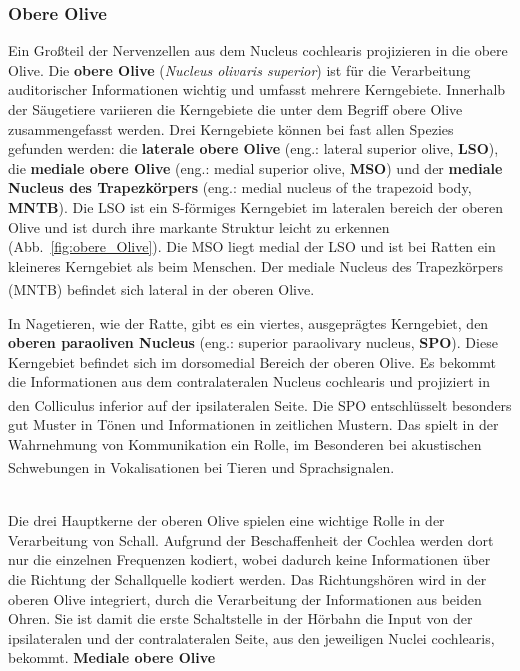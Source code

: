 \documentclass[12pt,a4paper,pdftex]{article}
\begin{document}
\subsubsection*{Obere Olive}
Ein Großteil der Nervenzellen aus dem Nucleus cochlearis projizieren in die obere Olive. Die \textbf{obere Olive} (\textit{Nucleus olivaris superior}) ist für die Verarbeitung auditorischer Informationen wichtig und umfasst mehrere Kerngebiete. Innerhalb der Säugetiere variieren die Kerngebiete die unter dem Begriff obere Olive zusammengefasst werden. Drei Kerngebiete können bei fast allen Spezies gefunden werden: die \textbf{laterale obere Olive} (eng.: lateral superior olive, \textbf{LSO}), die \textbf{mediale obere Olive} (eng.: medial superior olive, \textbf{MSO}) und der \textbf{mediale Nucleus des Trapezkörpers} (eng.: medial nucleus of the trapezoid body, \textbf{MNTB}). Die LSO ist ein S-förmiges Kerngebiet im lateralen bereich der oberen Olive und ist durch ihre markante Struktur leicht zu erkennen (Abb.~\ref{fig:obere_Olive}). Die MSO liegt medial der LSO und ist bei Ratten ein kleineres Kerngebiet als beim Menschen. Der mediale Nucleus des Trapezkörpers (MNTB) befindet sich lateral in der oberen Olive\textsuperscript{\cite[29]{paxinos2014rat}}.

In Nagetieren, wie der Ratte, gibt es ein viertes, ausgeprägtes Kerngebiet, den \textbf{oberen paraoliven Nucleus} (eng.: superior paraolivary nucleus, \textbf{SPO}). Diese Kerngebiet befindet sich im dorsomedial Bereich der oberen Olive. Es bekommt die Informationen aus dem contralateralen Nucleus cochlearis und projiziert in den Colliculus inferior auf der ipsilateralen Seite\textsuperscript{\cite[29]{paxinos2014rat}}. Die SPO entschlüsselt besonders gut Muster in Tönen und Informationen in zeitlichen Mustern. Das spielt in der Wahrnehmung von Kommunikation ein Rolle, im Besonderen bei akustischen Schwebungen in Vokalisationen bei Tieren und Sprachsignalen\textsuperscript{\cite[29]{paxinos2014rat}}. 
\\\\

\noindent Die drei Hauptkerne der oberen Olive spielen eine wichtige Rolle in der Verarbeitung von Schall. Aufgrund der Beschaffenheit der Cochlea werden dort nur die einzelnen Frequenzen kodiert, wobei dadurch keine Informationen über die Richtung der Schallquelle kodiert werden. Das Richtungshören wird in der oberen Olive integriert, durch die Verarbeitung der Informationen aus beiden Ohren. Sie ist damit die erste Schaltstelle in der Hörbahn die Input von der ipsilateralen und der contralateralen Seite, aus den jeweiligen Nuclei cochlearis, bekommt.
\newpage
\textbf{Mediale obere Olive}
\end{document}
